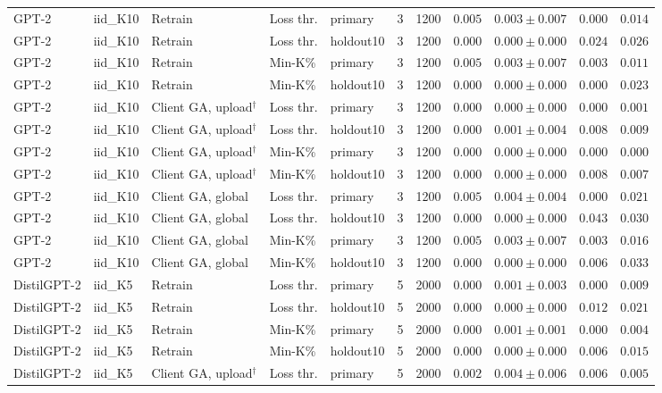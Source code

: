 {\begin{longtable}{@{\extracolsep{\fill}}lllllcccccc@{}}
GPT-2 & iid\_K10 & Retrain & Loss thr. & primary & 3 & 1200 & $0.005$ & $0.003 \pm 0.007$ & $0.000$ & $0.014$ \\
GPT-2 & iid\_K10 & Retrain & Loss thr. & holdout10 & 3 & 1200 & $0.000$ & $0.000 \pm 0.000$ & $0.024$ & $0.026$ \\
GPT-2 & iid\_K10 & Retrain & Min-K\% & primary & 3 & 1200 & $0.005$ & $0.003 \pm 0.007$ & $0.003$ & $0.011$ \\
GPT-2 & iid\_K10 & Retrain & Min-K\% & holdout10 & 3 & 1200 & $0.000$ & $0.000 \pm 0.000$ & $0.000$ & $0.023$ \\
GPT-2 & iid\_K10 & Client GA, upload$^{\dagger}$ & Loss thr. & primary & 3 & 1200 & $0.000$ & $0.000 \pm 0.000$ & $0.000$ & $0.001$ \\
GPT-2 & iid\_K10 & Client GA, upload$^{\dagger}$ & Loss thr. & holdout10 & 3 & 1200 & $0.000$ & $0.001 \pm 0.004$ & $0.008$ & $0.009$ \\
GPT-2 & iid\_K10 & Client GA, upload$^{\dagger}$ & Min-K\% & primary & 3 & 1200 & $0.000$ & $0.000 \pm 0.000$ & $0.000$ & $0.000$ \\
GPT-2 & iid\_K10 & Client GA, upload$^{\dagger}$ & Min-K\% & holdout10 & 3 & 1200 & $0.000$ & $0.000 \pm 0.000$ & $0.008$ & $0.007$ \\
GPT-2 & iid\_K10 & Client GA, global & Loss thr. & primary & 3 & 1200 & $0.005$ & $0.004 \pm 0.004$ & $0.000$ & $0.021$ \\
GPT-2 & iid\_K10 & Client GA, global & Loss thr. & holdout10 & 3 & 1200 & $0.000$ & $0.000 \pm 0.000$ & $0.043$ & $0.030$ \\
GPT-2 & iid\_K10 & Client GA, global & Min-K\% & primary & 3 & 1200 & $0.005$ & $0.003 \pm 0.007$ & $0.003$ & $0.016$ \\
GPT-2 & iid\_K10 & Client GA, global & Min-K\% & holdout10 & 3 & 1200 & $0.000$ & $0.000 \pm 0.000$ & $0.006$ & $0.033$ \\
DistilGPT-2 & iid\_K5 & Retrain & Loss thr. & primary & 5 & 2000 & $0.000$ & $0.001 \pm 0.003$ & $0.000$ & $0.009$ \\
DistilGPT-2 & iid\_K5 & Retrain & Loss thr. & holdout10 & 5 & 2000 & $0.000$ & $0.000 \pm 0.000$ & $0.012$ & $0.021$ \\
DistilGPT-2 & iid\_K5 & Retrain & Min-K\% & primary & 5 & 2000 & $0.000$ & $0.001 \pm 0.001$ & $0.000$ & $0.004$ \\
DistilGPT-2 & iid\_K5 & Retrain & Min-K\% & holdout10 & 5 & 2000 & $0.000$ & $0.000 \pm 0.000$ & $0.006$ & $0.015$ \\
DistilGPT-2 & iid\_K5 & Client GA, upload$^{\dagger}$ & Loss thr. & primary & 5 & 2000 & $0.002$ & $0.004 \pm 0.006$ & $0.006$ & $0.005$ \\

\end{longtable}}

